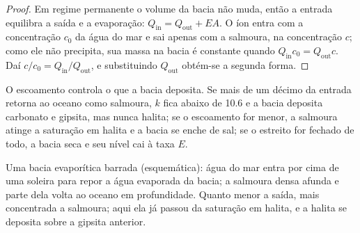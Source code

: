 \begin{proof}
Em regime permanente o volume da bacia não muda, então a entrada equilibra a saída e a
evaporação: $Q_{\mathrm{in}} = Q_{\mathrm{out}} +
EA$. O íon entra com a concentração $c_0$ da água do mar e sai apenas com a salmoura, na
concentração $c$; como ele não precipita, sua massa na bacia é constante quando
$Q_{\mathrm{in}}c_0 = Q_{\mathrm{out}}c$. Daí $c/c_0 =
Q_{\mathrm{in}}/Q_{\mathrm{out}}$, e substituindo $Q_{\mathrm{out}}$ obtém-se a segunda forma.
\end{proof}

O escoamento controla o que a bacia deposita. Se mais de um décimo da entrada retorna ao
oceano como salmoura, $k$ fica abaixo de 10.6 e a bacia deposita carbonato e gipsita, mas
nunca halita; se o escoamento for menor, a salmoura atinge a saturação em halita e a bacia
se enche de sal; se o estreito for fechado de todo, a bacia seca e seu nível cai à taxa $E$.

\begin{omfigure}

{\small Uma bacia evaporítica barrada (esquemática): água do mar entra por cima de uma
soleira para repor a água evaporada da bacia; a salmoura densa afunda e parte dela volta ao
oceano em profundidade. Quanto menor a saída, mais concentrada a salmoura; aqui ela já
passou da saturação em halita, e a halita se deposita sobre a gipsita anterior.}
\label{fig:b1:chemical-biogenic-sediments:barred}
\end{omfigure}

